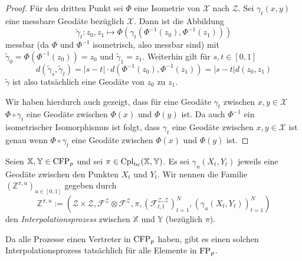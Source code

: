 \begin{proof}
    Für den dritten Punkt sei $\Phi$ eine Isometrie von $\mathcal{X}$ nach $\mathcal{Z}$. Sei $\gamma_t(x,y)$ eine messbare Geodäte bezüglich $\mathcal{X}$. Dann ist die Abbildung 
    $$\tilde{\gamma}_t: z_0, z_1 \mapsto \Phi(\gamma_t(\Phi^{-1}(z_0), \Phi^{-1}(z_1)))$$
     messbar (da $\Phi$ und $\Phi^{-1}$ isometrisch, also messbar sind) mit $\tilde{\gamma}_0 = \Phi(\Phi^{-1}(z_0))=z_0$ und $\tilde{\gamma}_1 = z_1$. Weiterhin gilt für $s,t\in[0,1]$
    $$d(\tilde{\gamma}_s, \tilde{\gamma}_t) = |s-t|\cdot d\left(\Phi^{-1}(z_0), \Phi^{-1}(z_1)\right) = |s-t|d(z_0, z_1)$$
    $\tilde{\gamma}$ ist also tatsächlich eine Geodäte von $z_0$ zu $z_1$.

    Wir haben hierdurch auch gezeigt, dass für eine Geodäte $\gamma_t$ zwischen $x,y\in \mathcal{X}$ $\Phi \circ \gamma_t$ eine Geodäte zwischen $\Phi(x)$ und $\Phi(y)$ ist. Da auch $\Phi^{-1}$ ein isometrischer Isomorphismus ist folgt, dass $\gamma_t$ eine Geodäte zwischen $x,y\in\mathcal{X}$ ist genau wenn $\Phi\circ \gamma_t$ eine Geodäte zwischen $\Phi(x)$ und $\Phi(y)$ ist.
\end{proof}
\begin{definition}[Interpolationsprozess]
    Seien $\mathbb{X,Y} \in \operatorname{CFP}_p$ und sei $\pi \in \operatorname{Cpl}_{\operatorname{bc}}(\mathbb{X,Y})$. Es sei $\gamma_u(X_t, Y_t)$ jeweils eine Geodäte zwischen den Punkten $X_t$ und $Y_t$. Wir nennen die Familie $(\mathbb{Z}^{\pi, u})_{u\in[0,1]}$ gegeben durch
    $$\mathbb{Z}^{\pi, u} := \left(\mathcal{Z}\times \mathcal{Z}, \mathcal{F}^\mathcal{Z}\otimes \mathcal{F}^\mathcal{Z}, \pi, \left(\mathcal{F}_{t,t}^{\mathcal{Z},\mathcal{Z}}\right)_{t=1}^N, \left(\gamma_u\left(X_t, Y_t\right)\right)_{t=1}^N \right) $$
    den \emph{Interpolationsprozess} zwischen $\mathbb{X}$ und $\mathbb{Y}$ (bezüglich $\pi$). 
\end{definition}
Da alle Prozesse einen Vertreter in $\operatorname{CFP}_p$ haben, gibt es einen solchen Interpolationsprozess tatsächlich für alle Elemente in $\operatorname{FP}_p$.

